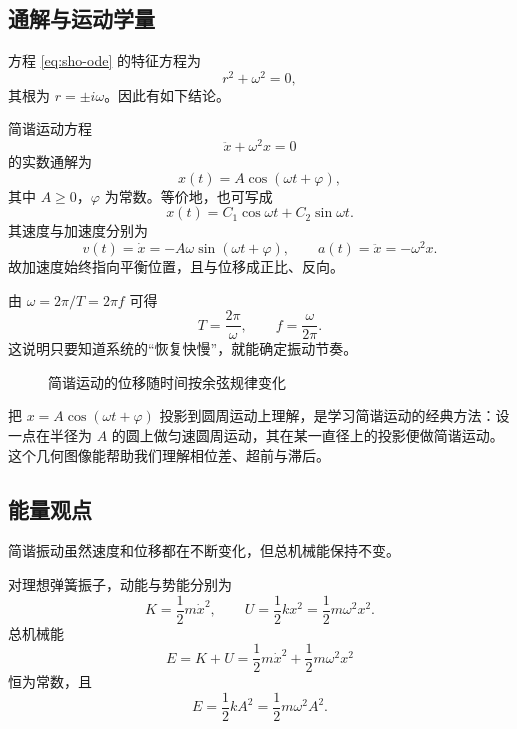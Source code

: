 \subsection{通解与运动学量}

方程 \eqref{eq:sho-ode} 的特征方程为
\[
r^2+\omega^2=0,
\]
其根为 $r=\pm i\omega$。因此有如下结论。

\begin{theorem}
简谐运动方程
\[
\ddot x+\omega^2x=0
\]
的实数通解为
\begin{equation}
 x(t)=A\cos(\omega t+\varphi),
\label{eq:sho-general}
\end{equation}
其中 $A\ge 0$，$\varphi$ 为常数。等价地，也可写成
\[
 x(t)=C_1\cos \omega t+C_2\sin \omega t.
\]
其速度与加速度分别为
\[
 v(t)=\dot x=-A\omega\sin(\omega t+\varphi),
\qquad
 a(t)=\ddot x=-\omega^2x.
\]
故加速度始终指向平衡位置，且与位移成正比、反向。
\end{theorem}

由 $\omega=2\pi/T=2\pi f$ 可得
\[
T=\frac{2\pi}{\omega},
\qquad
f=\frac{\omega}{2\pi}.
\]
这说明只要知道系统的“恢复快慢”，就能确定振动节奏。

\begin{figure}[htbp]
\centering
{}
\caption{简谐运动的位移随时间按余弦规律变化}
\end{figure}

\begin{remark}
把 $x=A\cos(\omega t+\varphi)$ 投影到圆周运动上理解，是学习简谐运动的经典方法：设一点在半径为 $A$ 的圆上做匀速圆周运动，其在某一直径上的投影便做简谐运动。这个几何图像能帮助我们理解相位差、超前与滞后。
\end{remark}

\subsection{能量观点}

简谐振动虽然速度和位移都在不断变化，但总机械能保持不变。

\begin{law}
对理想弹簧振子，动能与势能分别为
\[
K=\frac12 m\dot x^2,
\qquad
U=\frac12 kx^2=\frac12 m\omega^2x^2.
\]
总机械能
\begin{equation}
E=K+U=\frac12 m\dot x^2+\frac12 m\omega^2x^2
\label{eq:sho-energy}
\end{equation}
恒为常数，且
\[
E=\frac12 kA^2=\frac12 m\omega^2A^2.
\]
\end{law}

